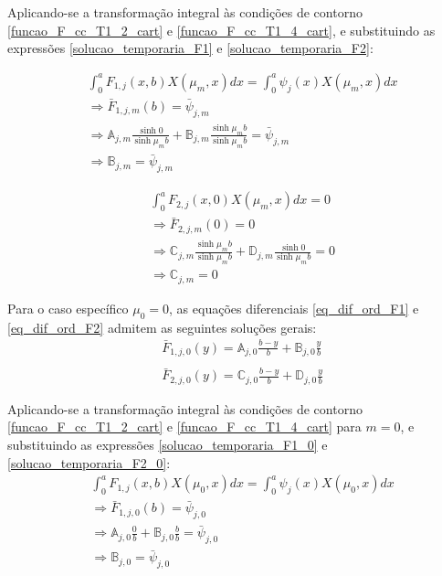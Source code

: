 Aplicando-se a transformação integral às condições de contorno \eqref{funcao_F_cc_T1_2_cart} e \eqref{funcao_F_cc_T1_4_cart}, e substituindo as expressões \eqref{solucao_temporaria_F1} e \eqref{solucao_temporaria_F2}:

\begin{align}
& \int_0^a F_{1,j}(x, b)X(\mu_m, x)dx = \int_0^a \psi_j(x) X(\mu_m, x)dx \nonumber \\
& \Rightarrow \bar{F}_{1,j,m}(b) = \bar{\psi}_{j, m} \nonumber \\
& \Rightarrow \mathbb{A}_{j,m}\frac{\sinh 0}{\sinh\mu_m b} + \mathbb{B}_{j,m}\frac{\sinh \mu_m b}{\sinh\mu_m b} = \bar{\psi}_{j, m} \nonumber \\
& \Rightarrow \mathbb{B}_{j,m} = \bar{\psi}_{j, m} \label{resultado_cte_5}
\end{align} 

\begin{align}
& \int_0^a F_{2,j}(x, 0)X(\mu_m, x)dx = 0 \nonumber \\
& \Rightarrow \bar{F}_{2,j,m}(0) = 0 \nonumber \\
& \Rightarrow \mathbb{C}_{j,m}\frac{\sinh\mu_m b}{\sinh\mu_m b} + \mathbb{D}_{j,m}\frac{\sinh 0}{\sinh\mu_m b} = 0 \nonumber \\
& \Rightarrow \mathbb{C}_{j,m} = 0 \label{resultado_cte_8}
\end{align} 

Para o caso específico $\mu_0 = 0$, as equações diferenciais \eqref{eq_dif_ord_F1} e \eqref{eq_dif_ord_F2} admitem as seguintes soluções gerais:
\begin{align}
& \bar{F}_{1,j,0}(y) = \mathbb{A}_{j,0}\frac{b - y}{b} + \mathbb{B}_{j,0}\frac{y}{b} \label{solucao_temporaria_F1_0}\\ \nonumber \\
& \bar{F}_{2,j,0}(y) = \mathbb{C}_{j,0}\frac{b - y}{b} + \mathbb{D}_{j,0}\frac{y}{b} \label{solucao_temporaria_F2_0}
\end{align} 

Aplicando-se a transformação integral às condições de contorno \eqref{funcao_F_cc_T1_2_cart} e \eqref{funcao_F_cc_T1_4_cart} para $m = 0$, e substituindo as expressões \eqref{solucao_temporaria_F1_0} e \eqref{solucao_temporaria_F2_0}:
\begin{align}
& \int_0^a F_{1,j}(x, b)X(\mu_0, x)dx = \int_0^a \psi_j(x)X(\mu_0, x)dx \nonumber \\
& \Rightarrow \bar{F}_{1,j,0}(b) = \bar{\psi}_{j,0} \nonumber \\
& \Rightarrow \mathbb{A}_{j,0}\frac{0}{b} + \mathbb{B}_{j,0}\frac{b}{b} = \bar{\psi}_{j,0} \nonumber \\
& \Rightarrow \mathbb{B}_{j,0} = \bar{\psi}_{j,0} \label{resultado_cte_2}
\end{align} 

